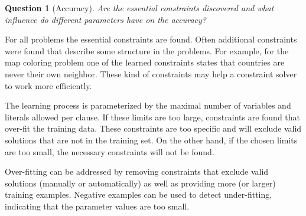 \documentclass[letterpaper]{article}
\newtheorem{question}{Question}
\theoremstyle{definition}
\begin{document}
\begin{question}[Accuracy]
  Are the essential constraints discovered and what influence do different parameters have on the accuracy?
\end{question}
For all problems the essential constraints are found.
Often additional constraints were found that describe some structure in the problems.
For example, for the map coloring problem one of the learned constraints states that countries are never their own neighbor.
These kind of constraints may help a constraint solver to work more efficiently.

The learning process is parameterized by the maximal number of variables and literals allowed per clause.
If these limits are too large, constraints are found that over-fit the training data.
These constraints are too specific and will exclude valid solutions that are not in the training set.
On the other hand, if the chosen limits are too small, the necessary constraints will not be found.

Over-fitting can be addressed by removing constraints that exclude valid solutions (manually or automatically) as well as providing more (or larger) training examples.
Negative examples can be used to detect under-fitting, indicating that the parameter values are too small.
\end{document}
